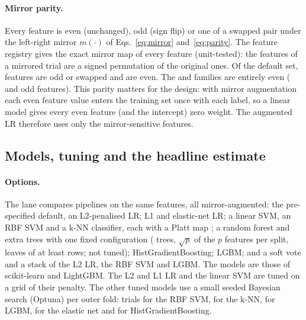 \paragraph{Mirror parity.} Every feature is even (unchanged), odd (sign flip) or one of a swapped pair under the
left-right mirror $m(\cdot)$ of Eqs.~\eqref{eq:mirror} and~\eqref{eq:parity}. The feature registry gives the
exact mirror map of every feature (unit-tested): the features of a mirrored trial are a signed permutation of
the original ones. Of the default set,  features are odd or swapped and  are even.
The  and  families are entirely even ( and
 odd features). This parity matters for the design: with mirror augmentation each even
feature value enters the training set once with each label, so a linear model gives every even feature (and the
intercept) zero weight. The augmented LR therefore uses only the mirror-sensitive features.


\subsection{Models, tuning and the headline estimate}\label{app:m2:models}

\paragraph{Options.} The lane compares  pipelines on the same features, all
mirror-augmented: the pre-specified
default, an L2-penalised LR; L1 and elastic-net LR; a linear SVM, an RBF SVM and a k-NN classifier, each with a
Platt map \cite{platt1999probabilistic}; a random forest and extra trees with one fixed configuration
( trees, $\sqrt{p}$ of the $p$ features per split, leaves of at least
 rows; not tuned); HistGradientBoosting; LGBM; and a soft vote and a stack of the L2 LR,
the RBF SVM and LGBM. The models are those of scikit-learn \cite{pedregosa2011sklearn} and LightGBM. The L2
and L1 LR and the linear SVM are tuned on a grid of their penalty. The other tuned models use a small seeded
Bayesian search (Optuna) per outer fold:  trials for the RBF SVM,  for
the k-NN,  for LGBM,  for the elastic net and  for
HistGradientBoosting.


